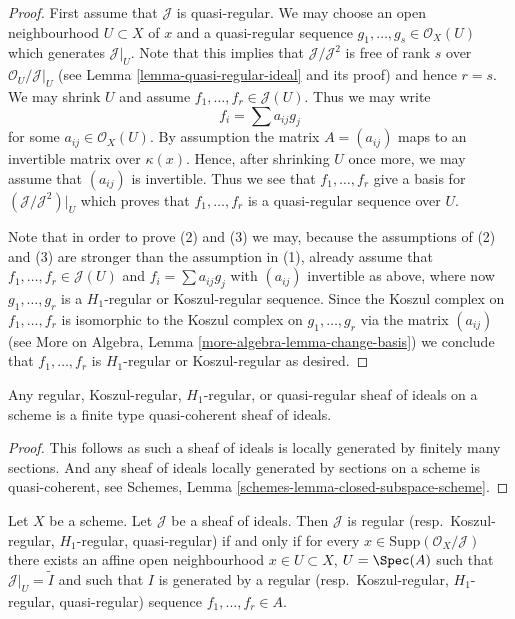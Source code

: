 \begin{proof}
First assume that $\mathcal{J}$ is quasi-regular. We may choose an
open neighbourhood $U \subset X$ of $x$ and a quasi-regular sequence
$g_1, \ldots, g_s \in \mathcal{O}_X(U)$ which generates $\mathcal{J}|_U$.
Note that this implies that $\mathcal{J}/\mathcal{J}^2$ is free of
rank $s$ over $\mathcal{O}_U/\mathcal{J}|_U$ (see
Lemma \ref{lemma-quasi-regular-ideal}
and its proof) and hence $r = s$.
We may shrink $U$ and assume $f_1, \ldots, f_r \in \mathcal{J}(U)$.
Thus we may write
$$
f_i = \sum a_{ij} g_j
$$
for some $a_{ij} \in \mathcal{O}_X(U)$. By assumption the matrix
$A = (a_{ij})$ maps to an invertible matrix over $\kappa(x)$.
Hence, after shrinking $U$ once more, we may assume that $(a_{ij})$
is invertible. Thus we see that $f_1, \ldots, f_r$ give a basis
for $(\mathcal{J}/\mathcal{J}^2)|_U$ which proves that $f_1, \ldots, f_r$
is a quasi-regular sequence over $U$.

\medskip\noindent
Note that in order to prove (2) and (3) we may, because the assumptions
of (2) and (3) are stronger than the assumption in (1), already assume that
$f_1, \ldots, f_r \in \mathcal{J}(U)$ and $f_i = \sum a_{ij}g_j$
with $(a_{ij})$ invertible as above, where now $g_1, \ldots, g_r$
is a $H_1$-regular or Koszul-regular sequence. Since the Koszul complex
on $f_1, \ldots, f_r$ is isomorphic to the Koszul complex on
$g_1, \ldots, g_r$ via the matrix $(a_{ij})$ (see
More on Algebra, Lemma \ref{more-algebra-lemma-change-basis})
we conclude that $f_1, \ldots, f_r$ is $H_1$-regular or Koszul-regular
as desired.
\end{proof}

\begin{lemma}
\label{lemma-regular-ideal-sheaf-quasi-coherent}
Any regular, Koszul-regular, $H_1$-regular, or quasi-regular sheaf
of ideals on a scheme is a finite type quasi-coherent sheaf of ideals.
\end{lemma}

\begin{proof}
This follows as such a sheaf of ideals is locally generated by
finitely many sections. And any sheaf of ideals locally generated
by sections on a scheme is quasi-coherent, see
Schemes, Lemma \ref{schemes-lemma-closed-subspace-scheme}.
\end{proof}

\begin{lemma}
\label{lemma-regular-ideal-sheaf-scheme}
Let $X$ be a scheme. Let $\mathcal{J}$ be a sheaf of ideals.
Then $\mathcal{J}$ is regular
(resp.\ Koszul-regular, $H_1$-regular, quasi-regular) if and only if
for every $x \in \text{Supp}(\mathcal{O}_X/\mathcal{J})$ there exists
an affine open neighbourhood $x \in U \subset X$, $U = \Spec(A)$
such that $\mathcal{J}|_U = \widetilde{I}$ and such that $I$
is generated by a regular (resp.\ Koszul-regular, $H_1$-regular,
quasi-regular) sequence $f_1, \ldots, f_r \in A$.
\end{lemma}

